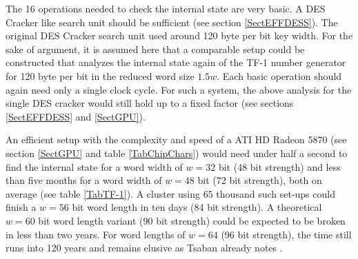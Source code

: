 \documentclass{article}
\begin{document}
The 16 operations needed to check the internal state are very basic. A DES
Cracker like search unit should be sufficient (see section \ref{SectEFFDESS}). 
The original DES Cracker search
unit used around 120 byte per bit key width. For the sake of argument, it is
assumed here that a comparable setup could be constructed that analyzes
the internal state again of the TF-1 number generator for 120 byte per bit in 
the reduced word size $1.5w$. 
Each basic operation should again need only a single clock cycle. For such a
system, the above analysis for the single DES cracker would still hold up to a
fixed factor (see sections \ref{SectEFFDESS} and \ref{SectGPU}).

An efficient setup with the complexity and speed of a ATI HD Radeon 5870 (see 
section \ref{SectGPU} and table \ref{TabChipChars}) would need under half a 
second to find the internal state
for a word width of $w = 32$ bit (48 bit strength) and less than five months
for a word width of $w = 48$ bit (72 bit strength), both on average (see table
\ref{TabTF-1}).
A cluster using 65 thousand such set-ups could finish a $w = 56$ bit word length
in ten days (84 bit strength). A theoretical $w = 60$ bit word length variant
(90 bit strength) could be expected to be broken in less than two years.
For word lengths of $w=64$ (96 bit strength), the time still runs into 120 years 
and remains elusive as Tsaban already notes \cite{tsaban:0507063}. 

\begin{comment}
w=32: 
(120 * (1.5 * 32) * (2^((1.5 * 32) - 1))) / (1.8275 * (10^18)) = 0.443583s
w=48:
((120 * (1.5 * 48) * (2^((1.5 * 48) - 1))) / (1.8275 * (10^18))) / (3 600 * 24 * 30.5) = 4.23616109 months
w=56:
(120 * (1.5 * 56) * (2^((1.5 * 56) - 1))) / (1.8275 * (10^18) * (2^16) * 3 600 * 24) = 9.42104576 days
w=60:
(120 * (1.5 * 60) * (2^((1.5 * 60) - 1))) / (1.8275 * (10^18) * (2^16) * 3 600 * 24 * 365) = 1.76990292 year
w=64:
(120 * (1.5 * 64) * (2^((1.5 * 64) - 1))) / (1.8275 * (10^18) * (2^16) * 3 600 * 24 * 365) = 120.825373 year
\end{comment}
\end{document}
